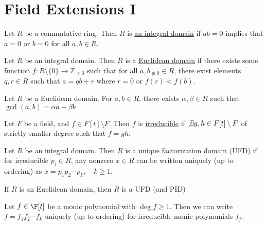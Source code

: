 \documentclass[a4paper]{article}
\begin{document}
\section{Field Extensions I}
\begin{tdefinition}
  Let \( R \) be a commutative ring. Then \( R \) is \ul{an integral domain} if \( ab=0 \) implies that \( a=0 \) or \( b=0 \) for all \( a,b\in R \).
\end{tdefinition}

\begin{tdefinition}
  Let \( R \) be an integral domain. Then \( R \) is a \ul{Euclidean domain} if there exists some function \( f:R\setminus\{0\}\to \mathbb{Z}_{\geq 0} \) such that for all \( a,b_{\not\equiv 0} \in R \), there exist elements \( q,r\in R \) such that \( a=qb+r \) where \( r=0 \) or \( f(r)<f(b) \).
\end{tdefinition}

\begin{ttheorem}
  Let \( R \) be a Euclidean domain. For \( a,b\in R \), there exists \( \alpha,\beta\in R \) such that \( \gcd(a,b) = \alpha a+\beta b \)
\end{ttheorem}

\begin{tdefinition}[Irreducible]
  Let \( {F} \) be a field, and \( f\in F[t]\setminus F \).
  Then \( f \) is \ul{irreducible} if \( \not\exists g,h\in F[t]\setminus F \) of strictly smaller degree such that \( f=gh \).
\end{tdefinition}

\begin{tdefinition}
  Let \( R \) be an integral domain.
  Then \( R \) is \ul{a unique factorization domain (UFD)} if for irreducible \( p_i\in R \), any nonzero \( x\in R \) can be written uniquely (up to ordering) as \( x=p_1p_2\cdots p_k,\quad k\geq 1 \).
\end{tdefinition}

\quad If \( R \) is an Euclidean domain, then \( R \) is a UFD (and PID)

\begin{tcorollary}
  Let \( f\in \F[t] \) be a monic polynomial with \( \deg f\geq 1 \).
  Then we can write \( f = f_1f_2\cdots f_k \) uniquely (up to ordering) for irreducible monic polynomials \( f_j \).
\end{tcorollary}
\end{document}
